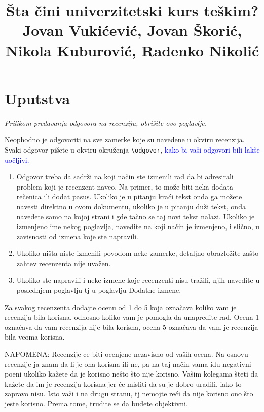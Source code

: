 \documentclass[a4paper]{report}
\newcommand{\odgovor}[1]{\textcolor{blue}{#1}}
\begin{document}
\title{Šta čini univerzitetski kurs teškim?\\ \small{Jovan Vukićević, Jovan Škorić, Nikola Kuburović, Radenko Nikolić}}

\maketitle

\tableofcontents

\chapter{Uputstva}
\emph{Prilikom predavanja odgovora na recenziju, obrišite ovo poglavlje.}

Neophodno je odgovoriti na sve zamerke koje su navedene u okviru recenzija. Svaki odgovor pišete u okviru okruženja \verb"\odgovor", \odgovor{kako bi vaši odgovori bili lakše uočljivi.} 
\begin{enumerate}

\item Odgovor treba da sadrži na koji način ste izmenili rad da bi adresirali problem koji je recenzent naveo. Na primer, to može biti neka dodata rečenica ili dodat pasus. Ukoliko je u pitanju kraći tekst onda ga možete navesti direktno u ovom dokumentu, ukoliko je u pitanju duži tekst, onda navedete samo na kojoj strani i gde tačno se taj novi tekst nalazi. Ukoliko je izmenjeno ime nekog poglavlja, navedite na koji način je izmenjeno, i slično, u zavisnosti od izmena koje ste napravili. 

\item Ukoliko ništa niste izmenili povodom neke zamerke, detaljno obrazložite zašto zahtev recenzenta nije uvažen.

\item Ukoliko ste napravili i neke izmene koje recenzenti nisu tražili, njih navedite u poslednjem poglavlju tj u poglavlju Dodatne izmene.
\end{enumerate}

Za svakog recenzenta dodajte ocenu od 1 do 5 koja označava koliko vam je recenzija bila korisna, odnosno koliko vam je pomogla da unapredite rad. Ocena 1 označava da vam recenzija nije bila korisna, ocena 5 označava da vam je recenzija bila veoma korisna. 

NAPOMENA: Recenzije ce biti ocenjene nezavisno od vaših ocena. Na osnovu recenzije ja znam da li je ona korisna ili ne, pa na taj način vama idu negativni poeni ukoliko kažete da je korisno nešto što nije korisno. Vašim kolegama šteti da kažete da im je recenzija korisna jer će misliti da su je dobro uradili, iako to zapravo nisu. Isto važi i na drugu stranu, tj nemojte reći da nije korisno ono što jeste korisno. Prema tome, trudite se da budete objektivni. 
\end{document}
